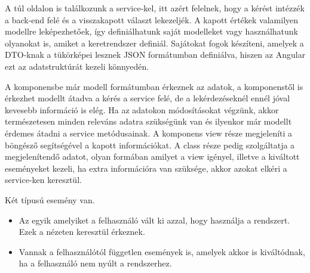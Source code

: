 A túl oldalon is találkozunk a service-kel, itt azért felelnek, hogy a kérést intézzék a back-end felé és a visszakapott választ lekezeljék. A kapott értékek valamilyen modellre leképezhetőek, így definiálhatunk saját modelleket vagy használhatunk olyanokat is, amiket a keretrendszer definiál. Sajátokat fogok készíteni, amelyek a DTO-knak a tükörképei lesznek JSON formátumban definiálva, hiszen az Angular ezt az adatstruktúrát kezeli könnyedén. 

A komponensbe már modell formátumban érkeznek az adatok, a komponenstől is érkezhet modellt átadva a kérés a service felé, de a lekérdezéseknél ennél jóval kevesebb információ is elég. Ha az adatokon módosításokat végzünk, akkor természetesen minden releváns adatra szükségünk van és ilyenkor már modellt érdemes átadni a service metódusainak.
A komponens view része megjeleníti a böngésző segítségével a kapott információkat. A class része pedig szolgáltatja a megjelenítendő adatot, olyan formában amilyet a view igényel, illetve a kiváltott eseményeket kezeli, ha extra információra van szüksége, akkor azokat elkéri a service-ken keresztül.

Két típusú esemény van.
\begin{itemize}
\item Az egyik amelyiket a felhasználó vált ki azzal, hogy használja a rendszert. Ezek a nézeten keresztül érkeznek.
\item Vannak a felhasználótól független események is, amelyek akkor is kiváltódnak, ha a felhasználó nem nyúlt a rendszerhez. 
\end{itemize}


